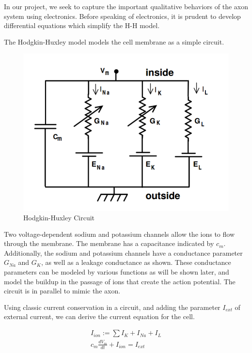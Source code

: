 \documentclass[12]{book}
\newcommand\0{\mathbf{0}}
\newcommand\<{\langle}
\renewcommand\>{\rangle}
\begin{document}
In our project, we seek to capture the important qualitative behaviors of the axon system using electronics. Before speaking of electronics, it is prudent to develop differential equations which simplify the H-H model.

The Hodgkin-Huxley model models the cell membrane as a simple circuit. 

\begin{figure}[h]
    \centering
    \includegraphics[scale=0.5]{hhmodel}
    \caption{Hodgkin-Huxley Circuit}
    \label{fig:my_label}
\end{figure}

Two voltage-dependent sodium and potassium channels allow the ions to flow through the membrane. The membrane has a capacitance indicated by $c_m$. Additionally, the sodium and potassium channels have a conductance parameter $G_{Na}$ and $G_K$, as well as a leakage conductance as shown. These conductance parameters can be modeled by various functions as will be shown later, and model the buildup in the passage of ions that create the action potential. The circuit is in parallel to mimic the axon. 

Using classic current conservation in a circuit, and adding the parameter $I_{ext}$ of external current, we can derive the current equation for the cell.

\begin{align*}
I_{ion} := \sum I_{K} + I_{Na} + I_L \\
    c_m\frac{dV_m}{dt} + I_{ion} = I_{ext}
\end{align*}
\end{document}
